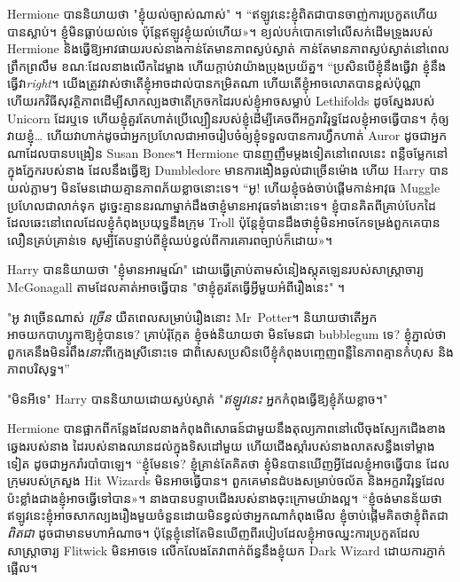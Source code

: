 {{{Hermione បាននិយាយថា "ខ្ញុំយល់ច្បាស់ណាស់" ។ “ឥឡូវ​នេះ​ខ្ញុំ​ពិត​ជា​បាន​ចាញ់​ការ​ប្រកួត​ហើយ​បាន​ស្លាប់។ ខ្ញុំ​មិន​ធ្លាប់​យល់​ទេ ប៉ុន្តែ​ឥឡូវ​ខ្ញុំ​យល់​ហើយ»។ ខ្យល់បក់បោកទៅលើសក់ដើមទ្រូងរបស់ Hermione និងធ្វើឱ្យអាវផាយរបស់នាងកាន់តែមានភាពស្ងប់ស្ងាត់ កាន់តែមានភាពស្ងប់ស្ងាត់នៅពេលព្រឹកព្រលឹម ខណៈដែលនាងលើកដៃម្ខាង ហើយក្តាប់វាយ៉ាងប្រុងប្រយ័ត្ន។ “ប្រសិនបើខ្ញុំនឹងធ្វើវា ខ្ញុំនឹងធ្វើវា\emph{right}។ យើងត្រូវវាស់ថាតើខ្ញុំអាចដាល់បានកម្រិតណា ហើយតើខ្ញុំអាចលោតបានខ្ពស់ប៉ុណ្ណា ហើយរកវិធីសុវត្ថិភាពដើម្បីសាកល្បងថាតើក្រចកដៃរបស់ខ្ញុំអាចសម្លាប់ Lethifolds ដូចស្នែងរបស់ Unicorn ដែរឬទេ ហើយខ្ញុំគួរតែហាត់ប្រើល្បឿនរបស់ខ្ញុំដើម្បីគេចពីអក្ខរាវិរុទ្ធដែលខ្ញុំអាចធ្វើបាន។ កុំ​ឲ្យ​វាយ​ខ្ញុំ… ហើយ​វា​ហាក់​ដូច​ជា​អ្នក​ប្រហែល​ជា​អាច​រៀបចំ​ឲ្យ​ខ្ញុំ​ទទួល​បាន​ការ​ហ្វឹក​ហាត់ Auror ដូច​ជា​អ្នក​ណា​ដែល​បាន​បង្រៀន Susan Bones។ Hermione បានញញឹមម្តងទៀតនៅពេលនេះ ពន្លឺចម្លែកនៅក្នុងភ្នែករបស់នាង ដែលនឹងធ្វើឱ្យ Dumbledore មានការងឿងឆ្ងល់ជាច្រើនម៉ោង ហើយ Harry បានយល់ភ្លាមៗ មិនមែនដោយគ្មានភាពភ័យខ្លាចនោះទេ។ “អូ! ហើយខ្ញុំចង់ចាប់ផ្តើមកាន់អាវុធ Muggle ប្រហែលជាលាក់ទុក ដូច្នេះគ្មាននរណាម្នាក់ដឹងថាខ្ញុំមានអាវុធទាំងនោះទេ។ ខ្ញុំ​បាន​គិត​ពី​គ្រាប់បែក​ដៃ​ដែល​ឆេះ​នៅ​ពេល​ដែល​ខ្ញុំ​កំពុង​ប្រយុទ្ធ​នឹង​ក្រុម Troll ប៉ុន្តែ​ខ្ញុំ​បាន​ដឹង​ថា​ខ្ញុំ​មិន​អាច​កែ​ទម្រង់​ពួកគេ​បាន​លឿន​គ្រប់គ្រាន់​ទេ សូម្បី​តែ​បន្ទាប់​ពី​ខ្ញុំ​ឈប់​ខ្វល់​ពី​ការ​គោរព​ច្បាប់​ក៏​ដោយ»។

Harry បាននិយាយថា "ខ្ញុំមានអារម្មណ៍" ដោយធ្វើត្រាប់តាមសំនៀងស្កុតឡេនរបស់សាស្រ្តាចារ្យ McGonagall តាមដែលគាត់អាចធ្វើបាន "ថាខ្ញុំគួរតែធ្វើអ្វីមួយអំពីរឿងនេះ" ។

"អូ វាច្រើនណាស់ \emph{ច្រើន} យឺតពេលសម្រាប់រឿងនោះ Mr~Potter។ និយាយថាតើអ្នកអាចយកបាហ្សូកាឱ្យខ្ញុំបានទេ? គ្រាប់រ៉ុក្កែត ខ្ញុំចង់និយាយថា មិនមែនជា bubblegum ទេ? ខ្ញុំភ្នាល់ថាពួកគេនឹងមិនរំពឹង\emph{នោះ}ពីក្មេងស្រីនោះទេ ជាពិសេសប្រសិនបើខ្ញុំកំពុងបញ្ចេញពន្លឺនៃភាពគ្មានកំហុស និងភាពបរិសុទ្ធ។”

"មិនអីទេ" Harry បាននិយាយដោយស្ងប់ស្ងាត់ "\emph{ឥឡូវនេះ} អ្នកកំពុងធ្វើឱ្យខ្ញុំភ័យខ្លាច។"

Hermione បានផ្អាកពីកន្លែងដែលនាងកំពុងពិសោធន៍ជាមួយនឹងតុល្យភាពនៅលើចុងស្បែកជើងខាងឆ្វេងរបស់នាង ដៃរបស់នាងឈានដល់ក្នុងទិសដៅមួយ ហើយជើងស្តាំរបស់នាងលាតសន្ធឹងទៅម្ខាងទៀត ដូចជាអ្នករាំរបាំបាឡេ។ “ខ្ញុំមែនទេ? ខ្ញុំគ្រាន់តែគិតថា ខ្ញុំមិនបានឃើញអ្វីដែលខ្ញុំអាចធ្វើបាន ដែលក្រុមរបស់ក្រសួង Hit Wizards មិនអាចធ្វើបាន។ ពួក​គេ​មាន​ដំបង​សម្រាប់​ចល័ត និង​អក្ខរាវិរុទ្ធ​ដែល​ប៉ះ​ខ្លាំង​ជាង​ខ្ញុំ​អាច​ធ្វើ​ទៅ​បាន»។ នាង​បាន​បន្ទាប​ជើង​របស់​នាង​ចុះ​ក្រោម​យ៉ាង​ល្អ​។ “ខ្ញុំចង់មានន័យថា ឥឡូវនេះខ្ញុំអាចសាកល្បងរឿងមួយចំនួនដោយមិនខ្វល់ថាអ្នកណាកំពុងមើល ខ្ញុំចាប់ផ្តើមគិតថាខ្ញុំពិតជា \emph{ពិតជា} ដូចជាមានមហាអំណាច។ ប៉ុន្តែខ្ញុំនៅតែមិនឃើញពីរបៀបដែលខ្ញុំអាចឈ្នះការប្រកួតដែលសាស្រ្តាចារ្យ Flitwick មិនអាចទេ លើកលែងតែវាពាក់ព័ន្ធនឹងខ្ញុំយក Dark Wizard ដោយការភ្ញាក់ផ្អើល។

}}}
